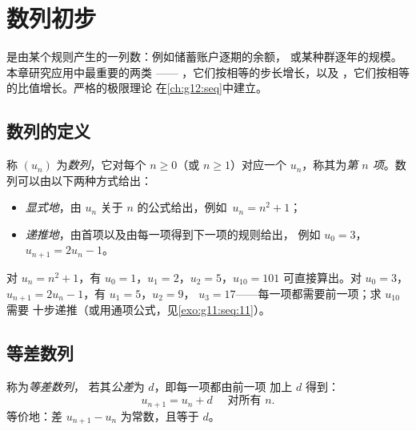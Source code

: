 \chapter{数列初步}\label{ch:g11:seq}

是由某个规则产生的一列数：例如储蓄账户逐期的余额，
或某种群逐年的规模。本章研究应用中最重要的两类
——
\emph{}，它们按相等的步长增长，以及
\emph{}，它们按相等的比值增长。严格的极限理论
在\cref{ch:g12:seq}中建立。

\section{数列的定义}

\begin{definition}[数列]\label{def:g11:seq:sequence}
称 $(u_n)$ 为\emph{数列}，它对每个
$n \geq 0$（或 $n \geq 1$）对应一个 $u_n$，称其为\emph{第
$n$ 项}。数列可以由以下两种方式给出：
\begin{itemize}
  \item \emph{显式地}，由 $u_n$ 关于 $n$ 的公式给出，例如\
        $u_n = n^2 + 1$；
  \item \emph{递推地}，由首项以及由每一项得到下一项的规则给出，
        例如 $u_0 = 3$，$u_{n+1} = 2u_n - 1$。
\end{itemize}
\end{definition}

\begin{example}
对 $u_n = n^2 + 1$，有 $u_0 = 1$，$u_1 = 2$，$u_2 = 5$，$u_{10} = 101$
可直接算出。对 $u_0 = 3$，$u_{n+1} = 2u_n - 1$，有 $u_1 = 5$，$u_2 = 9$，
$u_3 = 17$——每一项都需要前一项；求 $u_{10}$ 需要
十步递推（或用通项公式，见\cref{exo:g11:seq:11}）。
\end{example}

\section{等差数列}

\begin{definition}[等差数列]\label{def:g11:seq:arithmetic}
称为\emph{等差数列}，
若其\emph{公差}为 $d$，即每一项都由前一项
加上 $d$ 得到：
\[
u_{n+1} = u_n + d \quad \text{ 对所有 } n.
\]
等价地：差 $u_{n+1} - u_n$ 为常数，且等于 $d$。
\end{definition}

